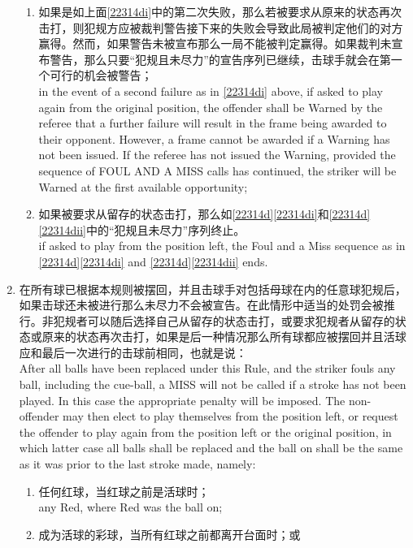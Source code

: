 \begin{enumerate}[label=(\alph*)]
\begin{enumerate}[label=(\roman*)]
        \item \label{22314dii}如果是如上面\ref{22314di}中的第二次失败，那么若被要求从原来的状态再次击打，则犯规方应被裁判警告接下来的失败会导致此局被判定他们的对方赢得。然而，如果警告未被宣布那么一局不能被判定赢得。如果裁判未宣布警告，那么只要``犯规且未尽力''的宣告序列已继续，击球手就会在第一个可行的机会被警告；\\
        in the event of a second failure as in \ref{22314di} above, if asked to play again from the original position, the offender shall be Warned by the referee that a further failure will result in the frame being awarded to their opponent. However, a frame cannot be awarded if a Warning has not been issued. If the referee has not issued the Warning, provided the sequence of FOUL AND A MISS calls has continued, the striker will be Warned at the first available opportunity;
        \item 如果被要求从留存的状态击打，那么如\ref{22314d}\ref{22314di}和\ref{22314d} \ref{22314dii}中的``犯规且未尽力''序列终止。\\
        if asked to play from the position left, the Foul and a Miss sequence as in \ref{22314d}\ref{22314di} and \ref{22314d}\ref{22314dii} ends.
    \end{enumerate}
    \item \label{22314e}在所有球已根据本规则被摆回，并且击球手对包括母球在内的任意球犯规后，如果击球还未被进行那么未尽力不会被宣告。在此情形中适当的处罚会被推行。非犯规者可以随后选择自己从留存的状态击打，或要求犯规者从留存的状态或原来的状态再次击打，如果是后一种情况那么所有球都应被摆回并且活球应和最后一次进行的击球前相同，也就是说：\\
    After all balls have been replaced under this Rule, and the striker fouls any ball, including the cue-ball, a MISS will not be called if a stroke has not been played. In this case the appropriate penalty will be imposed. The non-offender may then elect to play themselves from the position left, or request the offender to play again from the position left or the original position, in which latter case all balls shall be replaced and the ball on shall be the same as it was prior to the last stroke made, namely:
    \begin{enumerate}[label=(\roman*)]
        \item 任何红球，当红球之前是活球时；\\
        any Red, where Red was the ball on;
        \item 成为活球的彩球，当所有红球之前都离开台面时；或\\

\end{enumerate}
\end{enumerate}
